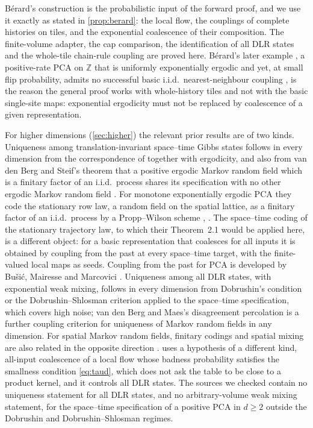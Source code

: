 \documentclass[11pt]{article}
\theoremstyle{plain}
\theoremstyle{definition}
\theoremstyle{remark}
\newcommand{\Z}{\mathbb{Z}}
\begin{document}
B\'erard's construction \cite{Berard23} is the probabilistic input of the forward proof, and we use it exactly as stated in \cref{prop:berard}: the local flow, the couplings of complete histories on tiles, and the exponential coalescence of their composition. The finite-volume adapter, the cap comparison, the identification of all DLR states and the whole-tile chain-rule coupling are proved here. B\'erard's later example \cite{Berard22}, a positive-rate PCA on $\Z$ that is uniformly exponentially ergodic \cite[Proposition~1]{Berard22} and yet, at small flip probability, admits no successful basic i.i.d.\ nearest-neighbour coupling \cite[Theorem~1]{Berard22}, is the reason the general proof works with whole-history tiles and not with the basic single-site maps: exponential ergodicity must not be replaced by coalescence of a given representation.

For higher dimensions (\cref{sec:higher}) the relevant prior results are of two kinds. Uniqueness among translation-invariant space--time Gibbs states follows in every dimension from the correspondence of \cite{GKLM89,LMS90} together with ergodicity, and also from van den Berg and Steif's theorem that a positive ergodic Markov random field which is a finitary factor of an i.i.d.\ process shares its specification with no other ergodic Markov random field \cite[Theorem~2.1]{vdBS99}. For monotone exponentially ergodic PCA they code the stationary row law, a random field on the spatial lattice, as a finitary factor of an i.i.d.\ process by a Propp--Wilson scheme \cite[Theorem~3.4]{vdBS99}, \cite{PW96}. The space--time coding of the stationary trajectory law, to which their Theorem~2.1 would be applied here, is a different object: for a basic representation that coalesces for all inputs it is obtained by coupling from the past at every space--time target, with the finite-valued local maps as seeds. Coupling from the past for PCA is developed by Bu\v{s}i\'c, Mairesse and Marcovici \cite{BMM13}. Uniqueness among all DLR states, with exponential weak mixing, follows in every dimension from Dobrushin's condition \cite{Dob68} or the Dobrushin--Shlosman criterion \cite{DS85,Weitz05} applied to the space--time specification, which covers high noise; van den Berg and Maes's disagreement percolation \cite{vdBM94} is a further coupling criterion for uniqueness of Markov random fields in any dimension. For spatial Markov random fields, finitary codings and spatial mixing are also related in the opposite direction \cite{HS00,Spinka20}.  uses a hypothesis of a different kind, all-input coalescence of a local flow whose badness probability satisfies the smallness condition \eqref{eq:taud}, which does not ask the table to be close to a product kernel, and it controls all DLR states. The sources we checked contain no uniqueness statement for all DLR states, and no arbitrary-volume weak mixing statement, for the space--time specification of a positive PCA in $d\ge2$ outside the Dobrushin and Dobrushin--Shlosman regimes.
\end{document}
